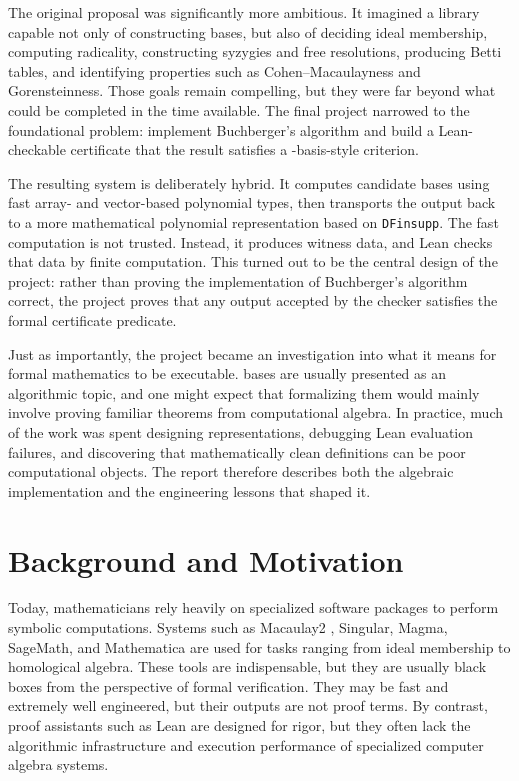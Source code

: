 \documentclass[acmsmall,nonacm,screen]{acmart}
\begin{document}
The original proposal was significantly more ambitious.
It imagined a library capable not only of constructing \Groebner{} bases, but also of deciding
ideal membership, computing radicality, constructing syzygies and free resolutions, producing
Betti tables, and identifying properties such as Cohen--Macaulayness and Gorensteinness.
Those goals remain compelling, but they were far beyond what could be completed in the time
available.
The final project narrowed to the foundational problem: implement Buchberger's algorithm and build
a Lean-checkable certificate that the result satisfies a \Groebner{}-basis-style criterion.

The resulting system is deliberately hybrid.
It computes candidate bases using fast array- and vector-based polynomial types, then transports
the output back to a more mathematical polynomial representation based on \texttt{DFinsupp}.
The fast computation is not trusted.
Instead, it produces witness data, and Lean checks that data by finite computation.
This turned out to be the central design of the project: rather than proving the implementation of
Buchberger's algorithm correct, the project proves that any output accepted by the checker satisfies
the formal certificate predicate.

Just as importantly, the project became an investigation into what it means for formal mathematics
to be executable.
\Groebner{} bases are usually presented as an algorithmic topic, and one might expect that
formalizing them would mainly involve proving familiar theorems from computational algebra.
In practice, much of the work was spent designing representations, debugging Lean evaluation
failures, and discovering that mathematically clean definitions can be poor computational objects.
The report therefore describes both the algebraic implementation and the engineering lessons that
shaped it.

\section{Background and Motivation}

Today, mathematicians rely heavily on specialized software packages to perform symbolic
computations.
Systems such as Macaulay2 \cite{Macaulay2}, Singular, Magma, SageMath, and Mathematica are used for
tasks ranging from ideal membership to homological algebra.
These tools are indispensable, but they are usually black boxes from the perspective of formal
verification.
They may be fast and extremely well engineered, but their outputs are not proof terms.
By contrast, proof assistants such as Lean are designed for rigor, but they often lack the
algorithmic infrastructure and execution performance of specialized computer algebra systems.
\end{document}
